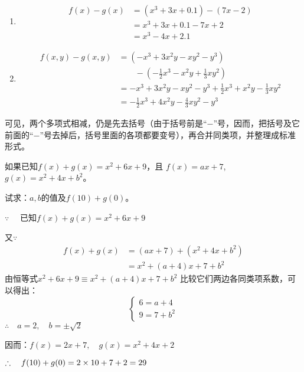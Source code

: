 \begin{solution}
    \begin{enumerate}
        \item \[\begin{split}
            f(x)-g(x)&=  (x^3+3x+0.1)-(7x-2)\\
            &=x^3+3x+0.1-7x+2\\
            &=x^3-4x+2.1
        \end{split}\]
        \item \[\begin{split}
            f(x,y)-g(x,y)&=(-x^3+3x^2y-xy^2-y^3) \\
            &\qquad -\left(-\frac{1}{2}x^3-x^2y+\frac{1}{3}xy^2\right)\\
            &=-x^3+3x^2y-xy^2-y^3+\frac{1}{2}x^3+x^2y-\frac{1}{3}xy^2\\
            &=-\frac{1}{2}x^3+4x^2y-\frac{4}{3}xy^2-y^3
        \end{split}\]
    \end{enumerate}
\end{solution}

可见，两个多项式相减，仍是先去括号（由于括号前是“$-$”号，因而，把括号及它前面的“$-$”号去掉后，括号里面的各项都要变号），再合并同类项，并整理成标准形式。

\begin{example}
    如果已知$f(x)+g(x)=x^2+6x+9$，且
$f (x) =ax+7$, $g (x) =x^2+4x+b^2$。

试求：$a,b$的值及$f(10)+g(0)$。
\end{example}

\begin{solution}
$\because\quad $ 已知$f(x)+g(x)=x^2+6x+9$

又$\because\quad $
\[\begin{split}
    f(x)+g(x)&=(ax+7)+(x^2+4x+b^2)\\
    &=x^2+ (a+4) x+7+b^2
\end{split}\]
    由恒等式$x^2+6x+9\equiv x^2+(a+4)x+7+b^2$
    比较它们两边各同类项系数，可以得出：
\[\begin{cases}
    6=a+4\\
    9=7+b^2
\end{cases}\]
$\therefore\quad a=2,\quad b=\pm\sqrt{2}$

因而：$f(x)=2x+7,\quad g(x)=x^2+4x+2$

$\therefore\quad f(10)+g(0)=2\times 10+7+2=29$
\end{solution}

